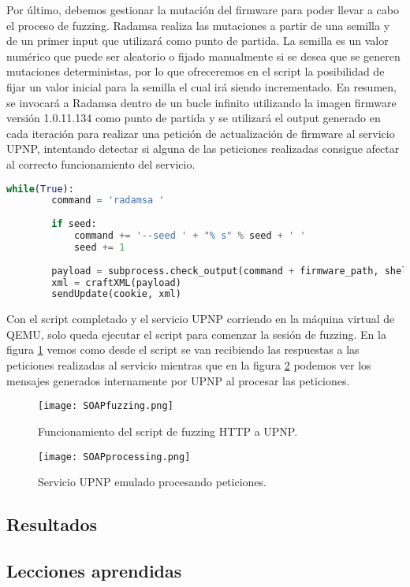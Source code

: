 Por último, debemos gestionar la mutación del firmware para poder llevar a cabo el proceso de fuzzing. Radamsa realiza las 
mutaciones a partir de una semilla y de un primer input que utilizará como punto de partida. La semilla es un valor numérico 
que puede ser aleatorio o fijado manualmente si se desea que se generen mutaciones deterministas, por lo que ofreceremos en 
el script la posibilidad de fijar un valor inicial para la semilla el cual irá siendo incrementado. En resumen, se invocará
a Radamsa dentro de un bucle infinito utilizando la imagen firmware versión 1.0.11.134 como punto de partida y se utilizará 
el output generado en cada iteración para realizar una petición de actualización de firmware al servicio UPNP, intentando 
detectar si alguna de las peticiones realizadas consigue afectar al correcto funcionamiento del servicio.

\begin{lstlisting}[language=python, caption=Integración con Radamsa para mutación de inputs., captionpos=b,
    frame=single, breaklines, showstringspaces=false]
    while(True):
        command = 'radamsa '
        
        if seed:
            command += '--seed ' + "% s" % seed + ' '
            seed += 1
        
        payload = subprocess.check_output(command + firmware_path, shell=True)
        xml = craftXML(payload)
        sendUpdate(cookie, xml)
\end{lstlisting}

Con el script completado y el servicio UPNP corriendo en la máquina virtual de QEMU, solo queda ejecutar el script para 
comenzar la sesión de fuzzing. En la figura \ref{fig:SOAPfuzzing} vemos como desde el script se van recibiendo las respuestas a las peticiones 
realizadas al servicio mientras que en la figura \ref{fig:SOAPprocessing} podemos ver los mensajes generados internamente por
UPNP al procesar las peticiones.

\begin{figure}[H]
    \centering
    \texttt{[image: SOAPfuzzing.png]}
    \caption{Funcionamiento del script de fuzzing HTTP a UPNP.}
    \label{fig:SOAPfuzzing}
\end{figure}

\begin{figure}[H]
    \centering
    \texttt{[image: SOAPprocessing.png]}
    \caption{Servicio UPNP emulado procesando peticiones.}
    \label{fig:SOAPprocessing}
\end{figure}

\subsection{Resultados}
\subsection{Lecciones aprendidas}
